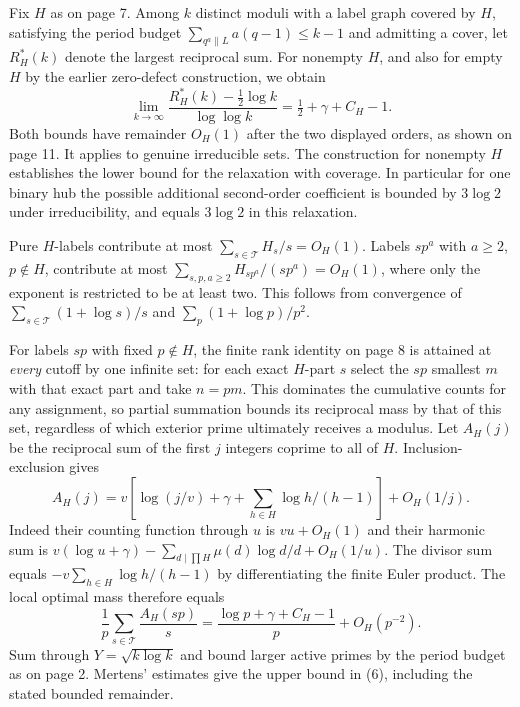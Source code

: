 \newpage
{}
Fix $H$ as on page 7. Among $k$ distinct moduli with a label graph covered by $H$, satisfying the period budget $\sum_{q^a\parallel L}a(q-1)\le k-1$ and admitting a cover, let $R_H^*(k)$ denote the largest reciprocal sum. For nonempty $H$, and also for empty $H$ by the earlier zero-defect construction, we obtain
\[
 \lim_{k\to\infty}\frac{R_H^*(k)-\tfrac12\log k}{\log\log k}
    =\tfrac12+\gamma+C_H-1.\tag{6}
\]
Both bounds have remainder $O_H(1)$ after the two displayed orders, as shown on page 11. It applies to genuine irreducible sets. The construction for nonempty $H$ establishes the lower bound for the relaxation with coverage. In particular for one binary hub the possible additional second-order coefficient is bounded by $3\log2$ under irreducibility, and equals $3\log2$ in this relaxation.

Pure $H$-labels contribute at most $\sum_{s\in\mathcal T}H_s/s=O_H(1)$. Labels $sp^a$ with $a\ge2$, $p\notin H$, contribute at most
$\sum_{s,p,a\ge2} H_{sp^a}/(sp^a)=O_H(1)$, where only the exponent is restricted to be at least two. This follows from convergence of $\sum_{s\in\mathcal T}(1+\log s)/s$ and $\sum_p(1+\log p)/p^2$.

For labels $sp$ with fixed $p\notin H$, the finite rank identity on page 8 is attained at \emph{every} cutoff by one infinite set: for each exact $H$-part $s$ select the $sp$ smallest $m$ with that exact part and take $n=pm$. This dominates the cumulative counts for any assignment, so partial summation bounds its reciprocal mass by that of this set, regardless of which exterior prime ultimately receives a modulus. Let $A_H(j)$ be the reciprocal sum of the first $j$ integers coprime to all of $H$. Inclusion-exclusion gives
\[
 A_H(j)=v[\log(j/v)+\gamma+\sum_{h\in H}\log h/(h-1)]+O_H(1/j).
\]
Indeed their counting function through $u$ is $vu+O_H(1)$ and their harmonic sum is $v(\log u+\gamma)-\sum_{d\mid\prod H}\mu(d)\log d/d+O_H(1/u)$. The divisor sum equals $-v\sum_{h\in H}\log h/(h-1)$ by differentiating the finite Euler product. The local optimal mass therefore equals
\[
 \frac1p\sum_{s\in\mathcal T}\frac{A_H(sp)}s
   =\frac{\log p+\gamma+C_H-1}{p}+O_H(p^{-2}).
\]
Sum through $Y=\sqrt{k\log k}$ and bound larger active primes by the period budget as on page 2. Mertens' estimates give the upper bound in (6), including the stated bounded remainder.

